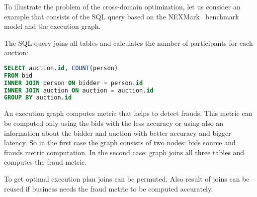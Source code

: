 To illustrate the problem of the cross-domain optimization, let us consider an example that consists of the SQL query based on the NEXMark~\cite{TODO} benchmark model and the execution graph.

The SQL query joins all tables and calculates the number of participants for each auction:
\begin{lstlisting}[language=SQL]
SELECT auction.id, COUNT(person)
FROM bid
INNER JOIN person ON bidder = person.id
INNER JOIN auction ON auction = auction.id
GROUP BY auction.id
\end{lstlisting}

An execution graph computes metric that helps to detect frauds.
This metric can be computed only using the bids with the less accuracy or using also an information about the bidder and auction with better accuracy and bigger latency.
So in the first case the graph consists of two nodes: bids source and frauds metric computation.
In the second case: graph joins all three tables and computes the fraud metric.

To get optimal execution plan joins can be permuted.
Also result of joins can be reused if business needs the fraud metric to be computed accurately.

